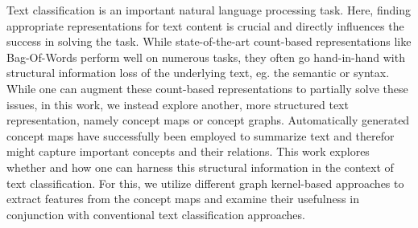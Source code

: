 Text classification is an important natural language processing task. 
Here, finding appropriate representations for text content is crucial and directly influences the success in solving the task.
While state-of-the-art count-based representations like Bag-Of-Words perform well on numerous tasks, they often go hand-in-hand with structural information loss of the underlying text, eg. the semantic or syntax.
While one can augment these count-based representations to partially solve these issues, in this work, we instead explore another, more structured text representation, namely concept maps or concept graphs.
Automatically generated concept maps have successfully been employed to summarize text and therefor might capture important concepts and their relations.
This work explores whether and how one can harness this structural information in the context of text classification.
For this, we utilize different graph kernel-based approaches to extract features from the concept maps and examine their usefulness in conjunction with conventional text classification approaches.